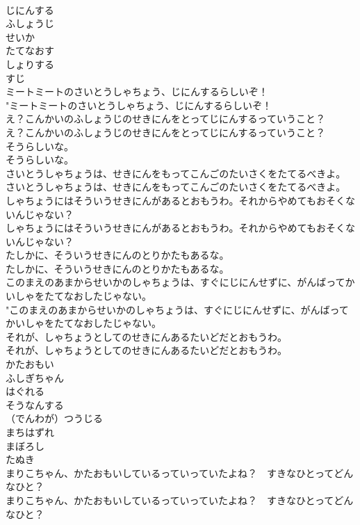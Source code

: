 \documentclass[8pt]{extreport}
\begin{document}
\begin{CJK}{UTF8}{min}
\\	じにんする
\\	ふしょうじ
\\	せいか
\\	たてなおす
\\	しょりする
\\	すじ
\\	ミートミートのさいとうしゃちょう、じにんするらしいぞ！	
\\	"ミートミートのさいとうしゃちょう、じにんするらしいぞ！ 
\\	え？こんかいのふしょうじのせきにんをとってじにんするっていうこと？	
\\	え？こんかいのふしょうじのせきにんをとってじにんするっていうこと？ 
\\	そうらしいな。	
\\	そうらしいな。 
\\	さいとうしゃちょうは、せきにんをもってこんごのたいさくをたてるべきよ。	
\\	さいとうしゃちょうは、せきにんをもってこんごのたいさくをたてるべきよ。 
\\	しゃちょうにはそういうせきにんがあるとおもうわ。それからやめてもおそくないんじゃない？	
\\	しゃちょうにはそういうせきにんがあるとおもうわ。それからやめてもおそくないんじゃない？ 
\\	たしかに、そういうせきにんのとりかたもあるな。	
\\	たしかに、そういうせきにんのとりかたもあるな。 
\\	このまえのあまからせいかのしゃちょうは、すぐにじにんせずに、がんばってかいしゃをたてなおしたじゃない。	
\\	"このまえのあまからせいかのしゃちょうは、すぐにじにんせずに、がんばってかいしゃをたてなおしたじゃない。 
\\	それが、しゃちょうとしてのせきにんあるたいどだとおもうわ。	
\\	それが、しゃちょうとしてのせきにんあるたいどだとおもうわ。 
\\	かたおもい
\\	ふしぎちゃん
\\	はぐれる
\\	そうなんする
\\	（でんわが）つうじる
\\	まちはずれ
\\	まぼろし
\\	たぬき
\\	まりこちゃん、かたおもいしているっていっていたよね？　すきなひとってどんなひと？	
\\	まりこちゃん、かたおもいしているっていっていたよね？　すきなひとってどんなひと？ 

\end{CJK}
\end{document}
